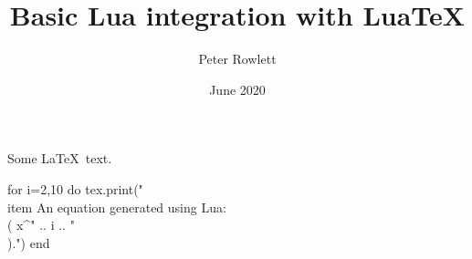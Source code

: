 \documentclass{article}
\title{Basic Lua integration with LuaTeX}
\author{Peter Rowlett}
\date{June 2020}
\begin{document}
\maketitle

Some \LaTeX\ text.

\begin{itemize}
    \begin{luacode*}
    for i=2,10 do
        tex.print("\\item An equation generated using Lua: \\( x^{" .. i .. "} \\).")
    end
    \end{luacode*}
\end{itemize}
\end{document}
